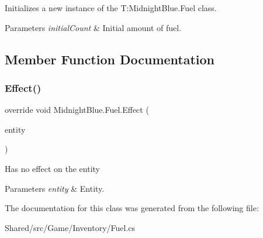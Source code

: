 Initializes a new instance of the T\+:\+Midnight\+Blue.\+Fuel class. 


\begin{DoxyParams}{Parameters}
{\em initial\+Count} & Initial amount of fuel.\\
\hline
\end{DoxyParams}


\subsection{Member Function Documentation}
\hypertarget{class_midnight_blue_1_1_fuel_a9ab52c79211ec8cdcc9389f772615ac0}{}\label{class_midnight_blue_1_1_fuel_a9ab52c79211ec8cdcc9389f772615ac0} 
\subsubsection{\texorpdfstring{Effect()}{Effect()}}
{\footnotesize\ttfamily override void Midnight\+Blue.\+Fuel.\+Effect (\begin{DoxyParamCaption}\item[{Entity}]{entity }\end{DoxyParamCaption})\hspace{0.3cm}{\ttfamily [inline]}}



Has no effect on the entity 


\begin{DoxyParams}{Parameters}
{\em entity} & Entity.\\
\hline
\end{DoxyParams}


The documentation for this class was generated from the following file\+:\begin{DoxyCompactItemize}
\item 
Shared/src/\+Game/\+Inventory/Fuel.\+cs\end{DoxyCompactItemize}
